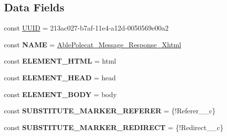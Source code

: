 \subsection*{Data Fields}
\begin{DoxyCompactItemize}
\item 
const \hyperlink{class_able_polecat___message___response___xhtml_a74b892c8c0b86bf9d04c5819898c51e7}{U\+U\+I\+D} = \textquotesingle{}213ac027-\/b7af-\/11e4-\/a12d-\/0050569e00a2\textquotesingle{}
\item 
\hypertarget{class_able_polecat___message___response___xhtml_a244352f035b82b20b0efa506167fd862}{}const {\bfseries N\+A\+M\+E} = \textquotesingle{}\hyperlink{class_able_polecat___message___response___xhtml}{Able\+Polecat\+\_\+\+Message\+\_\+\+Response\+\_\+\+Xhtml}\textquotesingle{}\label{class_able_polecat___message___response___xhtml_a244352f035b82b20b0efa506167fd862}

\item 
\hypertarget{class_able_polecat___message___response___xhtml_a8a4486691c89aa7944b0f5ccf39ba399}{}const {\bfseries E\+L\+E\+M\+E\+N\+T\+\_\+\+H\+T\+M\+L} = \textquotesingle{}html\textquotesingle{}\label{class_able_polecat___message___response___xhtml_a8a4486691c89aa7944b0f5ccf39ba399}

\item 
\hypertarget{class_able_polecat___message___response___xhtml_a0cf8c4ced01a408e29b59adedfe802e2}{}const {\bfseries E\+L\+E\+M\+E\+N\+T\+\_\+\+H\+E\+A\+D} = \textquotesingle{}head\textquotesingle{}\label{class_able_polecat___message___response___xhtml_a0cf8c4ced01a408e29b59adedfe802e2}

\item 
\hypertarget{class_able_polecat___message___response___xhtml_a83a04a4f8d9f88822b1e61a25d5b4d1c}{}const {\bfseries E\+L\+E\+M\+E\+N\+T\+\_\+\+B\+O\+D\+Y} = \textquotesingle{}body\textquotesingle{}\label{class_able_polecat___message___response___xhtml_a83a04a4f8d9f88822b1e61a25d5b4d1c}

\item 
\hypertarget{class_able_polecat___message___response___xhtml_a6c64ee4fc21ea2318da5c6d4943eeddd}{}const {\bfseries S\+U\+B\+S\+T\+I\+T\+U\+T\+E\+\_\+\+M\+A\+R\+K\+E\+R\+\_\+\+R\+E\+F\+E\+R\+E\+R} = \textquotesingle{}\{!Referer\+\_\+\+\_\+c\}\textquotesingle{}\label{class_able_polecat___message___response___xhtml_a6c64ee4fc21ea2318da5c6d4943eeddd}

\item 
\hypertarget{class_able_polecat___message___response___xhtml_aa926e786b48723cc1966d6955aae4a96}{}const {\bfseries S\+U\+B\+S\+T\+I\+T\+U\+T\+E\+\_\+\+M\+A\+R\+K\+E\+R\+\_\+\+R\+E\+D\+I\+R\+E\+C\+T} = \textquotesingle{}\{!Redirect\+\_\+\+\_\+c\}\textquotesingle{}\label{class_able_polecat___message___response___xhtml_aa926e786b48723cc1966d6955aae4a96}

\end{DoxyCompactItemize}

